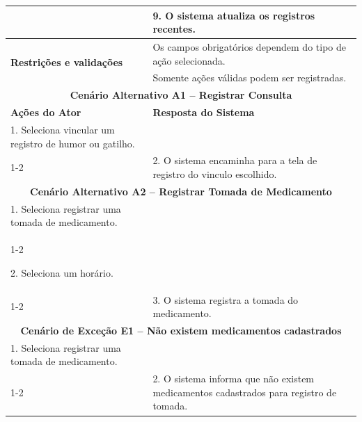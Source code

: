 \begin{longtable}{| p{} | p{} |}
&
9. O sistema atualiza os registros recentes. \\
\hline

\multirow{2}{.40\textwidth}{\textbf{Restrições e validações}}
&
Os campos obrigatórios dependem do tipo de ação selecionada. \\
\cline{2-2}

&
Somente ações válidas podem ser registradas. \\
\hline

\multicolumn{2}{|c|}{\textbf{Cenário Alternativo A1 -- Registrar Consulta}}\\
\hline

\textbf{Ações do Ator} &
\textbf{Resposta do Sistema} \\
\hline

1. Seleciona vincular um registro de humor ou gatilho. & \\
\cline{1-2}

&
2. O sistema encaminha para a tela de registro do vinculo escolhido. \\

\hline

\multicolumn{2}{|c|}{\textbf{Cenário Alternativo A2 -- Registrar Tomada de Medicamento}}\\
\hline

1. Seleciona registrar uma tomada de medicamento. & \\
\cline{1-2}

2. Seleciona um horário. & \\
\cline{1-2}

&
3. O sistema registra a tomada do medicamento. \\
\hline

\multicolumn{2}{|c|}{\textbf{Cenário de Exceção E1 -- Não existem medicamentos cadastrados}}\\
\hline

1. Seleciona registrar uma tomada de medicamento. & \\
\cline{1-2}

&
2. O sistema informa que não existem medicamentos cadastrados para
registro de tomada. \\

\hline

\end{longtable}
